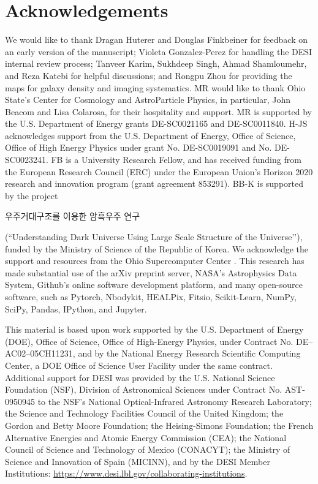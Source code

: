 \section*{Acknowledgements}
We would like to thank Dragan Huterer and Douglas Finkbeiner for feedback on an early version of the manuscript; Violeta Gonzalez-Perez for handling the DESI internal review process; Tanveer Karim, Sukhdeep Singh, Ahmad Shamloumehr, and Reza Katebi for helpful discussions; and Rongpu Zhou for providing the maps for galaxy density and imaging systematics. MR would like to thank Ohio State's Center for Cosmology and AstroParticle Physics, in particular, John Beacom and Lisa Colarosa, for their hospitality and support. MR is supported by the U.S. Department of Energy grants DE-SC0021165 and DE-SC0011840. H-JS acknowledges support from the U.S. Department of Energy, Office of Science, 
Office of High Energy Physics under grant No. DE-SC0019091 and No. DE-SC0023241. FB is a University Research Fellow, and has received funding from the European Research Council (ERC) under the European Union’s Horizon 2020 research and innovation program (grant agreement 853291). BB-K is supported by the project \begin{CJK}{UTF8}{mj}우주거대구조를 이용한 암흑우주 연구\end{CJK} (``Understanding Dark Universe Using Large Scale Structure of the Universe’’), funded by the Ministry of Science of the Republic of Korea. We acknowledge the support and resources from the Ohio Supercomputer Center \citep[OSC;][]{OhioSupercomputerCenter1987}. This research has made substantial use of the arXiv preprint server, NASA’s Astrophysics Data System, Github's online software development platform, and many open-source software, such as Pytorch, Nbodykit, HEALPix, Fitsio, Scikit-Learn, NumPy, SciPy, Pandas, IPython, and Jupyter. 


This material is based upon work supported by the U.S. Department of Energy (DOE), Office of Science, Office of High-Energy Physics, under Contract No. DE–AC02–05CH11231, and by the National Energy Research Scientific Computing Center, a DOE Office of Science User Facility under the same contract. Additional support for DESI was provided by the U.S. National Science Foundation (NSF), Division of Astronomical Sciences under Contract No. AST-0950945 to the NSF's National Optical-Infrared Astronomy Research Laboratory; the Science and Technology Facilities Council of the United Kingdom; the Gordon and Betty Moore Foundation; the Heising-Simons Foundation; the French Alternative Energies and Atomic Energy Commission (CEA); the National Council of Science and Technology of Mexico (CONACYT); the Ministry of Science and Innovation of Spain (MICINN), and by the DESI Member Institutions: \href{https://www.desi.lbl.gov/collaborating-institutions}{https://www.desi.lbl.gov/collaborating-institutions}.

